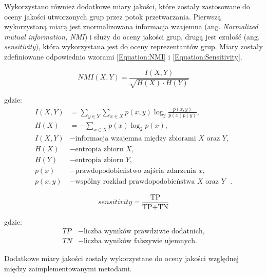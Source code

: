 \documentclass{article}
\begin{document}
{                Wykorzystano również dodatkowe miary jakości, które zostały zastosowane do oceny jakości utworzonych grup przez potok przetwarzania. Pierwszą wykorzystaną miarą jest znormalizowana informacja wzajemna (ang. \textit{Normalized mutual information, NMI}) i służy do oceny jakości grup, drugą jest czułość (ang. \textit{sensitivity}), która wykorzystana jest do oceny reprezentantów grup. Miary zostały zdefiniowane odpowiednio wzorami \eqref{Equation:NMI} i \eqref{Equation:Sensitivity}.
        
                \begin{equation}
                    NMI(X, Y) = \frac{I(X, Y)}{\sqrt{H(X) \cdot H(Y)}}
                    \label{Equation:NMI}
                \end{equation}
        
                gdzie:
                \begin{align*}
                    I(X, Y) &= \sum_{y \in Y}{ \sum_{x \in X}{p(x, y) \log_{2}{\frac{p(x, y)}{p(x) p(y)}}}}, \\
                    H(X) &= - \sum_{x \in X}{ p(x) \log_{2}{p(x)}}, \\
                    I(X, Y) &- \text{informacja wzajemna między zbiorami $X$ oraz $Y$}, \\
                    H(X) &- \text{entropia zbioru $X$}, \\
                    H(Y) &- \text{entropia zbioru $Y$}, \\
                    p(x) &- \text{prawdopodobieństwo zajścia zdarzenia $x$}, \\
                    p(x, y) &- \text{wspólny rozkład prawdopodobieństwa $X$ oraz $Y$ }.
                \end{align*}
        
                \begin{equation}
                    sensitivity = \frac{\text{TP}}{
                        \text{TP} + \text{TN}
                    }
                    \label{Equation:Sensitivity}
                \end{equation}
        
                gdzie:
                \begin{align*}
                    TP &- \text{liczba wyników prawdziwie dodatnich,} \\
                    TN &- \text{liczba wyników fałszywie ujemnych.}
                \end{align*}
        
                Dodatkowe miary jakości zostały wykorzystane do oceny jakości względnej między zaimplementowanymi metodami.
            }
\end{document}
